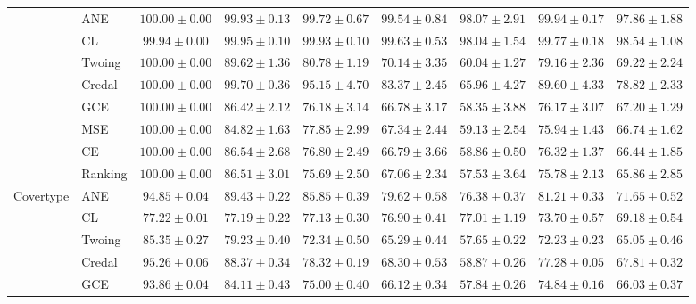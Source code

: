 \documentclass[letterpaper]{article} %
\begin{document}
\begin{table}[t]
\begin{tabular}{clccccccc}
 & ANE    & $\mathbf{100.00 \pm 0.00}$ & $\mathbf{99.93 \pm 0.13}$ & $\mathbf{99.72 \pm 0.67}$ & $\mathbf{99.54 \pm 0.84}$ & $\mathbf{98.07 \pm 2.91}$ & $\mathbf{99.94 \pm 0.17}$ & $\mathbf{97.86 \pm 1.88}$ \\
 & CL     & $99.94 \pm 0.00$ & $\mathbf{99.95 \pm 0.10}$ & $\mathbf{99.93 \pm 0.10}$ & $\mathbf{99.63 \pm 0.53}$ & $\mathbf{98.04 \pm 1.54}$ & $\mathbf{99.77 \pm 0.18}$ & $\mathbf{98.54 \pm 1.08}$ \\
 & Twoing & $\mathbf{100.00 \pm 0.00}$ & $89.62 \pm 1.36$ & $80.78 \pm 1.19$ & $70.14 \pm 3.35$ & $60.04 \pm 1.27$ & $79.16 \pm 2.36$ & $69.22 \pm 2.24$ \\
 & Credal & $\mathbf{100.00 \pm 0.00}$ & $\mathbf{99.70 \pm 0.36}$ & $95.15 \pm 4.70$ & $83.37 \pm 2.45$ & $65.96 \pm 4.27$ & $89.60 \pm 4.33$ & $78.82 \pm 2.33$ \\
 & GCE    & $\mathbf{100.00 \pm 0.00}$ & $86.42 \pm 2.12$ & $76.18 \pm 3.14$ & $66.78 \pm 3.17$ & $58.35 \pm 3.88$ & $76.17 \pm 3.07$ & $67.20 \pm 1.29$ \\
 & MSE    & $\mathbf{100.00 \pm 0.00}$ & $84.82 \pm 1.63$ & $77.85 \pm 2.99$ & $67.34 \pm 2.44$ & $59.13 \pm 2.54$ & $75.94 \pm 1.43$ & $66.74 \pm 1.62$ \\
 & CE     & $\mathbf{100.00 \pm 0.00}$ & $86.54 \pm 2.68$ & $76.80 \pm 2.49$ & $66.79 \pm 3.66$ & $58.86 \pm 0.50$ & $76.32 \pm 1.37$ & $66.44 \pm 1.85$ \\
 & Ranking & $\mathbf{100.00 \pm 0.00}$ & $86.51 \pm 3.01$ & $75.69 \pm 2.50$ & $67.06 \pm 2.34$ & $57.53 \pm 3.64$ & $75.78 \pm 2.13$ & $65.86 \pm 2.85$ \\
\hline
\multirow{8}{*}{Covertype}
 & ANE    & $94.85 \pm 0.04$ & $\mathbf{89.43 \pm 0.22}$ & $\mathbf{85.85 \pm 0.39}$ & $\mathbf{79.62 \pm 0.58}$ & $\mathbf{76.38 \pm 0.37}$ & $\mathbf{81.21 \pm 0.33}$ & $\mathbf{71.65 \pm 0.52}$ \\
 & CL     & $77.22 \pm 0.01$ & $77.19 \pm 0.22$ & $77.13 \pm 0.30$ & $76.90 \pm 0.41$ & $\mathbf{77.01 \pm 1.19}$ & $73.70 \pm 0.57$ & $69.18 \pm 0.54$ \\
 & Twoing & $85.35 \pm 0.27$ & $79.23 \pm 0.40$ & $72.34 \pm 0.50$ & $65.29 \pm 0.44$ & $57.65 \pm 0.22$ & $72.23 \pm 0.23$ & $65.05 \pm 0.46$ \\
 & Credal & $95.26 \pm 0.06$ & $88.37 \pm 0.34$ & $78.32 \pm 0.19$ & $68.30 \pm 0.53$ & $58.87 \pm 0.26$ & $77.28 \pm 0.05$ & $67.81 \pm 0.32$ \\
 & GCE    & $93.86 \pm 0.04$ & $84.11 \pm 0.43$ & $75.00 \pm 0.40$ & $66.12 \pm 0.34$ & $57.84 \pm 0.26$ & $74.84 \pm 0.16$ & $66.03 \pm 0.37$ \\

\end{tabular}
\end{table}
\end{document}

